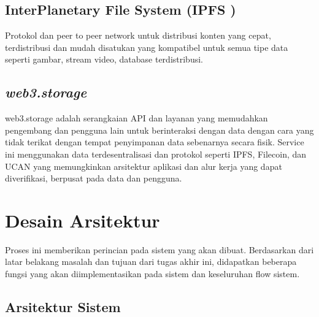 \subsection{InterPlanetary File System (IPFS )}
Protokol dan peer to
peer network untuk distribusi konten yang cepat, terdistribusi
dan mudah disatukan yang kompatibel untuk semua tipe data
seperti gambar, stream video, database terdistribusi.

\subsection{\emph{web3.storage}}
web3.storage adalah serangkaian API dan layanan yang memudahkan pengembang dan pengguna lain untuk berinteraksi
dengan data dengan cara yang tidak terikat dengan tempat penyimpanan data sebenarnya secara fisik. Service ini menggunakan data terdesentralisasi dan protokol
seperti IPFS, Filecoin, dan UCAN yang memungkinkan arsitektur aplikasi dan alur kerja yang dapat diverifikasi, berpusat pada data dan pengguna.

\section{Desain Arsitektur}
Proses ini memberikan perincian pada sistem yang akan dibuat. Berdasarkan dari latar
belakang masalah dan tujuan dari tugas akhir ini, didapatkan beberapa fungsi yang akan
diimplementasikan pada sistem dan keseluruhan flow sistem.

\subsection{Arsitektur Sistem}

